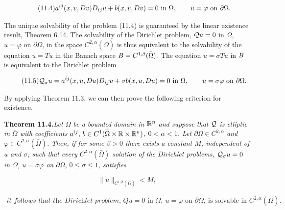 \begin{equation}
\tag{11.4}
a^{ij}(x,v,D v)D_{ij}u+b(x,v,D v)=0\ \text{in }\Omega,\qquad u=\varphi\ \text{on }\partial\Omega.
\end{equation}

\noindent The unique solvability of the problem (11.4) is guaranteed by the linear existence
result, Theorem 6.14. The solvability of the Dirichlet problem, $\mathcal{Q} u=0$ in $\Omega$, $u=\varphi$
on $\partial\Omega$, in the space $C^{2,\alpha}(\bar\Omega)$ is thus equivalent to the solvability of the equation
$u=Tu$ in the Banach space $B=C^{1,\beta}(\bar\Omega)$. The equation $u=\sigma Tu$ in $B$ is equivalent
to the Dirichlet problem

\begin{equation}
\tag{11.5}
\mathcal{Q}_{\sigma}u=a^{ij}(x,u,D u)D_{ij}u+\sigma b(x,u,D u)=0\ \text{in }\Omega,\qquad u=\sigma\varphi\ \text{on }\partial\Omega.
\end{equation}

\noindent By applying Theorem 11.3, we can then prove the following criterion for existence.

\medskip
\begin{theorem}
\label{gt-thm-11-4}
\textbf{Theorem 11.4.}\quad \textit{Let $\Omega$ be a bounded domain in $\mathbb{R}^n$ and suppose that $\mathcal{Q}$ is elliptic in}
\newline
\textit{$\bar\Omega$ with coefficients $a^{ij},\,b\in C^{1}(\bar\Omega\times\mathbb{R}\times\mathbb{R}^n)$, $0<\alpha<1$. Let $\partial\Omega\in C^{2,\alpha}$ and $\varphi\in C^{2,\alpha}(\bar\Omega)$.}
\newline
\textit{Then, if for some $\beta>0$ there exists a constant $M$, independent of $u$ and $\sigma$, such that}
\newline
\textit{every $C^{2,\alpha}(\bar\Omega)$ solution of the Dirichlet problems, $\mathcal{Q}_{\sigma}u=0$ in $\Omega$, $u=\sigma\varphi$ on $\partial\Omega$,}
\newline
\textit{$0\leq\sigma\leq 1$, satisfies}

\begin{equation}
\tag{11.6}
\|u\|_{C^{1,\beta}(\bar\Omega)}<M,
\end{equation}
\end{theorem}

\begin{gather*}
\textit{it follows that the Dirichlet problem, } Qu=0 \text{ in } \Omega,\ u=\varphi \text{ on } \partial\Omega,\ \text{is solvable in } C^{2,\alpha}(\overline{\Omega}).
\end{gather*}

